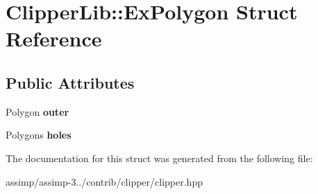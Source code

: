 \hypertarget{struct_clipper_lib_1_1_ex_polygon}{\section{Clipper\+Lib\+:\+:Ex\+Polygon Struct Reference}
\label{struct_clipper_lib_1_1_ex_polygon}
}
\subsection*{Public Attributes}
\begin{DoxyCompactItemize}
\item 
\hypertarget{struct_clipper_lib_1_1_ex_polygon_a732165286ba18d79afeeac1d8ccb7d7a}{Polygon {\bfseries outer}}\label{struct_clipper_lib_1_1_ex_polygon_a732165286ba18d79afeeac1d8ccb7d7a}

\item 
\hypertarget{struct_clipper_lib_1_1_ex_polygon_a2747ae27de714013463f64f00417dba8}{Polygons {\bfseries holes}}\label{struct_clipper_lib_1_1_ex_polygon_a2747ae27de714013463f64f00417dba8}

\end{DoxyCompactItemize}


The documentation for this struct was generated from the following file\+:\begin{DoxyCompactItemize}
\item 
assimp/assimp-\/3../contrib/clipper/clipper.\+hpp\end{DoxyCompactItemize}
